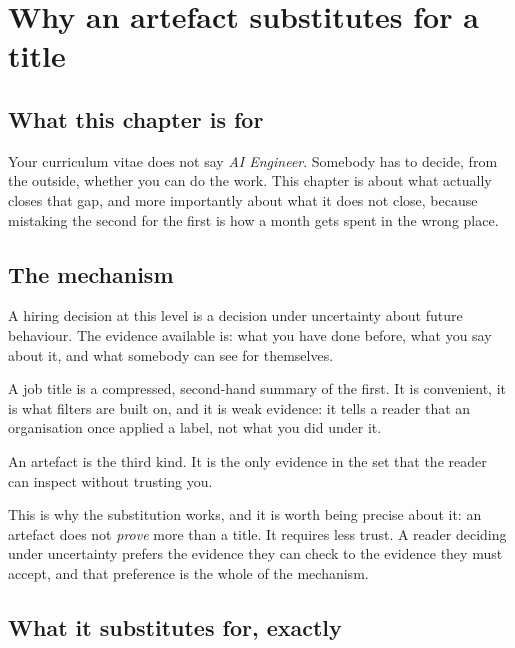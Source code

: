 \chapter{Why an artefact substitutes for a title}
\label{ch:artefact}

\section*{What this chapter is for}

Your curriculum vitae does not say \emph{AI Engineer}. Somebody has to decide,
from the outside, whether you can do the work. This chapter is about what
actually closes that gap, and \dash{} more importantly \dash{} about what it
does not close, because mistaking the second for the first is how a month gets
spent in the wrong place.

\section{The mechanism}

A hiring decision at this level is a decision under uncertainty about future
behaviour. The evidence available is: what you have done before, what you say
about it, and what somebody can see for themselves.

A job title is a compressed, second-hand summary of the first. It is
convenient, it is what filters are built on, and it is weak evidence: it tells a
reader that an organisation once applied a label, not what you did under it.

An artefact is the third kind. It is the only evidence in the set that the
reader can inspect without trusting you. 

\begin{kitnote}
This is why the substitution works, and it is worth being precise about it:
an artefact does not \emph{prove} more than a title. It requires less trust. A
reader deciding under uncertainty prefers the evidence they can check to the
evidence they must accept, and that preference is the whole of the mechanism.
\end{kitnote}

\section{What it substitutes for, exactly}

